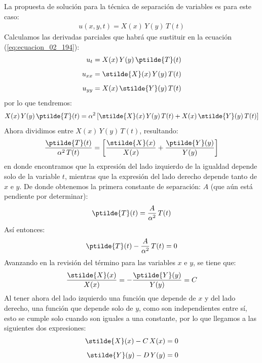 \par
La propuesta de solución para la técnica de separación de variables es para este caso:
\begin{align}
u (x, y, t) = X(x) \, Y(y) \, T(t)
\label{eq:ecuacion_02_194}
\end{align}
Calculamos las derivadas parciales que habrá que sustituir en la ecuación (\ref{eq:ecuacion_02_194}):
\begin{align*}
u_{t} &= X(x) \, Y(y) \, \ptilde{T} (t) \\[0.5em]
u_{xx} &= \stilde{X} (x) \, Y(y) \, T(t) \\[0.5em]
u_{yy} &= X(x) \, \stilde{Y} (y) \, T(t)
\end{align*}
por lo que tendremos:
\begin{align*}
X(x) \, Y(y) \, \ptilde{T} (t) = \alpha^{2} \left[ \stilde{X} (x) \, Y(y) \, T(t) + X(x) \, \stilde{Y} (y) \, T(t) \right]
\end{align*}
Ahora dividimos entre $X(x) \, Y(y) \, T(t)$, resultando:
\begin{align*}
\dfrac{\ptilde{T}(t)}{\alpha^{2}  \, T(t)} = \left[ \dfrac{\stilde{X}(x)}{X(x)} + \dfrac{\ptilde{Y}(y)}{Y(y)} \right]
\end{align*}
en donde encontramos que la expresión del lado izquierdo de la igualdad depende solo de la variable $t$, mientras que la expresión del lado derecho depende tanto de $x$ e $y$. De donde obtenemos la primera constante de separación: $A$ (que aún está pendiente por determinar):
\begin{align*}
\ptilde{T}(t) = \dfrac{A}{\alpha^{2}} \, T(t)
\end{align*}
Así entonces:
\begin{align}
\ptilde{T}(t) - \dfrac{A}{\alpha^{2}} \, T(t) = 0
\label{eq:ecuacion_02_195}
\end{align}
Avanzando en la revisión del término para las variables $x$ e $y$, se tiene que:
\begin{align*}
\dfrac{\stilde{X}(x)}{X(x)} = -  \dfrac{\ptilde{Y}(y)}{Y(y)} = C
\end{align*}
Al tener ahora del lado izquierdo una función que depende de $x$ y del lado derecho, una función que depende solo de $y$, como son independientes entre sí, esto se cumple solo cuando son iguales a una constante, por lo que llegamos a las siguientes dos expresiones:
\begin{align}
\stilde{X}(x) - C \, X(x) = 0 \label{eq:ecuacion_02_196} \\[0.5em]
\stilde{Y}(y) - D \, Y(y) = 0 \label{eq:ecuacion_02_197}
\end{align}
